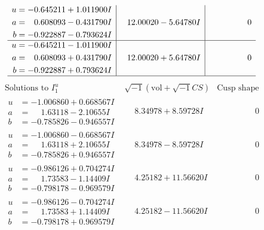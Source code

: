 \documentclass[1p]{elsarticle_modified}
\theoremstyle{definition}
\newcommand{\I}{\sqrt{-1}}
\begin{document}
$$\begin{array}{c|c|c}
\begin{aligned}
u &= -0.645211 + 1.011900 I \\
a &= \phantom{-}0.608093 - 0.431790 I \\
b &= -0.922887 - 0.793624 I\end{aligned}
 & \phantom{-}12.00020 - 5.64780 I & \phantom{-0.000000 } 0 \\ \hline\begin{aligned}
u &= -0.645211 - 1.011900 I \\
a &= \phantom{-}0.608093 + 0.431790 I \\
b &= -0.922887 + 0.793624 I\end{aligned}
 & \phantom{-}12.00020 + 5.64780 I & \phantom{-0.000000 } 0\\
 \hline 
 \end{array}$$\newpage$$\begin{array}{c|c|c}  
\text{Solutions to }I^u_{1}& \I (\text{vol} + \sqrt{-1}CS) & \text{Cusp shape}\\
 \hline 
\begin{aligned}
u &= -1.006860 + 0.668567 I \\
a &= \phantom{-}1.63118 - 2.10655 I \\
b &= -0.785826 - 0.946557 I\end{aligned}
 & \phantom{-}8.34978 + 8.59728 I & \phantom{-0.000000 } 0 \\ \hline\begin{aligned}
u &= -1.006860 - 0.668567 I \\
a &= \phantom{-}1.63118 + 2.10655 I \\
b &= -0.785826 + 0.946557 I\end{aligned}
 & \phantom{-}8.34978 - 8.59728 I & \phantom{-0.000000 } 0 \\ \hline\begin{aligned}
u &= -0.986126 + 0.704274 I \\
a &= \phantom{-}1.73583 - 1.14409 I \\
b &= -0.798178 - 0.969579 I\end{aligned}
 & \phantom{-}4.25182 + 11.56620 I & \phantom{-0.000000 } 0 \\ \hline\begin{aligned}
u &= -0.986126 - 0.704274 I \\
a &= \phantom{-}1.73583 + 1.14409 I \\
b &= -0.798178 + 0.969579 I\end{aligned}
 & \phantom{-}4.25182 - 11.56620 I & \phantom{-0.000000 } 0 \\ \hline\begin{aligned}

\end{aligned}
\end{array}$$
\end{document}
